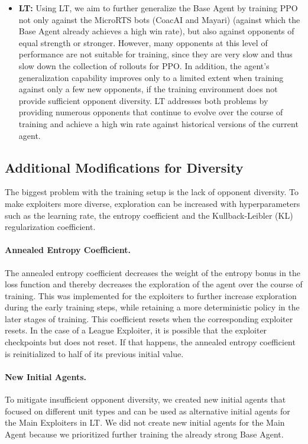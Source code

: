 \documentclass[10pt,twocolumn,letterpaper]{article}
\begin{document}
\begin{itemize}
    \item \textbf{LT:} Using LT, we aim to further generalize the Base Agent by training PPO not only against the MicroRTS bots (CoacAI and Mayari) (against which the Base Agent already achieves a high win rate), but also against opponents of equal strength or stronger.
        However, many opponents at this level of performance are not suitable for training, since they are very slow and thus slow down the collection of rollouts for PPO.
        In addition, the agent’s generalization capability improves only to a limited extent when training against only a few new opponents, if the training environment does not provide sufficient opponent diversity.
        LT addresses both problems by providing numerous opponents that continue to evolve over the course of training and achieve a high win rate against historical versions of the current agent.
\end{itemize}




\subsection{Additional Modifications for Diversity}
The biggest problem with the training setup is the lack of opponent diversity.
To make exploiters more diverse, exploration can be increased with hyperparameters such as the learning rate, the entropy coefficient and the Kullback-Leibler (KL) regularization coefficient.

\paragraph{Annealed Entropy Coefficient.}
\label{par:annealed_entropy_coefficient}
The annealed entropy coefficient decreases the weight of the entropy bonus in the loss function and thereby decreases the exploration of the agent over the course of training.
This was implemented for the exploiters to further increase exploration during the early training steps, while retaining a more deterministic policy in the later stages of training.
This coefficient resets when the corresponding exploiter resets.
In the case of a League Exploiter, it is possible that the exploiter checkpoints but does not reset.
If that happens, the annealed entropy coefficient is reinitialized to half of its previous initial value.


\paragraph{New Initial Agents.}
To mitigate insufficient opponent diversity, we created new initial agents that focused on different unit types and can be used as alternative initial agents for the Main Exploiters in LT.
We did not create new initial agents for the Main Agent because we prioritized further training the already strong Base Agent.
\end{document}
